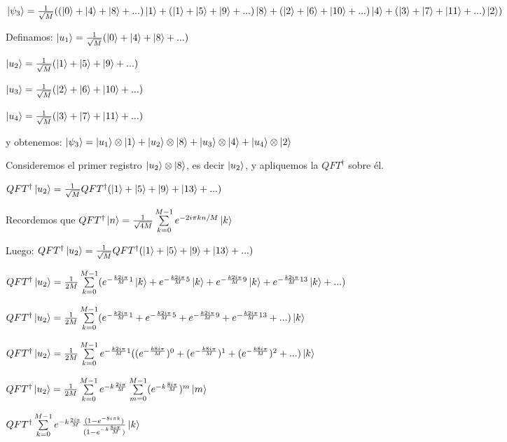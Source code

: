 $\ket{\psi_3} = \frac{1}{\sqrt{M}} ((\ket{0} + \ket{4} + \ket{8} + ...)\ket{1} + (\ket{1} + \ket{5} + \ket{9} + ...) \ket{8} + (\ket{2} + \ket{6} + \ket{10} + ...) \ket{4} + (\ket{3} + \ket{7} + \ket{11} + ...) \ket{2})$

Definamos: $\ket{u_1} = \frac{1}{\sqrt{M}} (\ket{0} + \ket{4} + \ket{8} + ...)$

$\ket{u_2} = \frac{1}{\sqrt{M}} (\ket{1} + \ket{5} + \ket{9} + ...)$

$\ket{u_3} = \frac{1}{\sqrt{M}} (\ket{2} + \ket{6} + \ket{10} + ...)$

$\ket{u_4} = \frac{1}{\sqrt{M}} (\ket{3} + \ket{7} + \ket{11} + ...)$

y obtenemos: $\ket{\psi_3} = \ket{u_1} \otimes \ket{1} + \ket{u_2} \otimes \ket{8} + \ket{u_3} \otimes \ket{4} + \ket{u_4} \otimes \ket{2}$

Consideremos el primer registro $\ket{u_2} \otimes \ket{8}$, es decir $\ket{u_2}$, y apliquemos la $QFT^\dagger$ sobre él.

$QFT^\dagger \ket{u_2} = \frac{1}{\sqrt{M}} QFT^\dagger (\ket{1} + \ket{5} + \ket{9} + \ket{13} + ...)$

Recordemos que $QFT^\dagger \ket{n} = \frac{1}{\sqrt{4 M}} \sum\limits_{k=0}^{M-1} e^{-2 i \pi k n /M} \ket{k}$

Luego: $QFT^\dagger \ket{u_2} = \frac{1}{\sqrt{M}} QFT^\dagger (\ket{1} + \ket{5} + \ket{9} + \ket{13} + ...)$

$QFT^\dagger \ket{u_2} = \frac{1}{2M} \sum\limits_{k=0}^{M-1} (e^{- \frac{k 2 i \pi}{M} 1} \ket{k} + e^{- \frac{k 2 i \pi}{M} 5} \ket{k} + e^{- \frac{k 2 i \pi}{M} 9} \ket{k} + e^{- \frac{k 2 i \pi}{M} 13} \ket{k} + ...)$


$QFT^\dagger \ket{u_2} = \frac{1}{2M} \sum\limits_{k=0}^{M-1} (e^{- \frac{k 2 i \pi}{M} 1} + e^{- \frac{k 2 i \pi}{M} 5} + e^{- \frac{k 2 i \pi}{M} 9} + e^{- \frac{k 2 i \pi}{M} 13} + ...) \ket{k}$

$QFT^\dagger \ket{u_2} = \frac{1}{2M} \sum\limits_{k=0}^{M-1} e^{- \frac{k 2 i \pi}{M} 1} ((e^{- \frac{k 8 i \pi}{M}})^0 + (e^{- \frac{k 8 i \pi}{M}})^1 + (e^{- \frac{k 8 i \pi}{M}})^2 + ...) \ket{k}$

$QFT^\dagger \ket{u_2} = \frac{1}{2M} \sum\limits_{k=0}^{M-1} e^{-k \frac{2 i \pi}{M}} \sum\limits_{m=0}^{M-1} (e^{-k \frac{8 i \pi}{M}})^m \ket{m}$

$QFT^\dagger \sum\limits_{k=0}^{M-1} e^{-k \frac{2 i \pi}{M}} \frac{(1-e^{-8 i \pi k})}{(1 - e^{-k \frac{8 i \pi}{M}})} \ket{k}$

